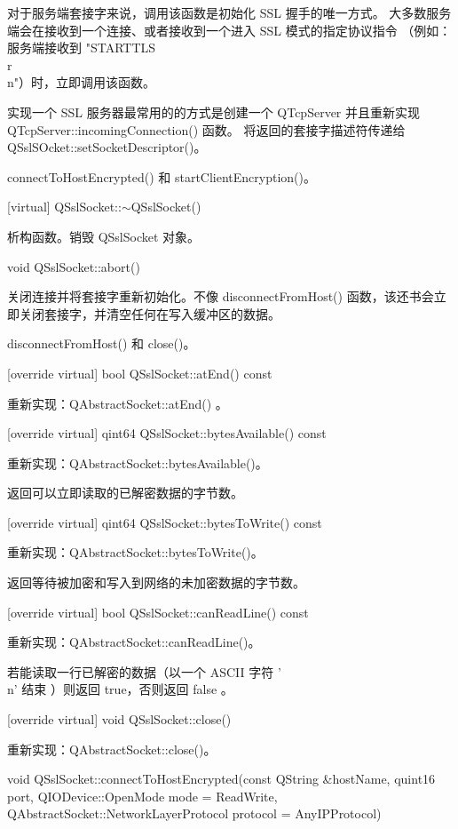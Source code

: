 对于服务端套接字来说，调用该函数是初始化 SSL 握手的唯一方式。
大多数服务端会在接收到一个连接、或者接收到一个进入 SSL 模式的指定协议指令
（例如：服务端接收到 "STARTTLS\\r\\n"）时，立即调用该函数。

实现一个 SSL 服务器最常用的的方式是创建一个 QTcpServer 并且重新实现 QTcpServer::incomingConnection() 函数。
将返回的套接字描述符传递给 QSslSOcket::setSocketDescriptor()。

\begin{seeAlso}
connectToHostEncrypted() 和 startClientEncryption()。
\end{seeAlso}

[virtual] QSslSocket::$\sim$QSslSocket()

析构函数。销毁 QSslSocket 对象。

void QSslSocket::abort()

关闭连接并将套接字重新初始化。不像 disconnectFromHost() 函数，该还书会立即关闭套接字，并清空任何在写入缓冲区的数据。

\begin{seeAlso}
disconnectFromHost() 和 close()。
\end{seeAlso}

[override virtual] bool QSslSocket::atEnd() const

重新实现：QAbstractSocket::atEnd() 。

[override virtual] qint64 QSslSocket::bytesAvailable() const

重新实现：QAbstractSocket::bytesAvailable()。

返回可以立即读取的已解密数据的字节数。

[override virtual] qint64 QSslSocket::bytesToWrite() const

重新实现：QAbstractSocket::bytesToWrite()。

返回等待被加密和写入到网络的未加密数据的字节数。

[override virtual] bool QSslSocket::canReadLine() const

重新实现：QAbstractSocket::canReadLine()。

若能读取一行已解密的数据（以一个 ASCII 字符 '\\n' 结束 ）则返回 true，否则返回 false 。

[override virtual] void QSslSocket::close()

重新实现：QAbstractSocket::close()。

void QSslSocket::connectToHostEncrypted(const QString \&hostName, quint16 port, QIODevice::OpenMode mode = ReadWrite, QAbstractSocket::NetworkLayerProtocol protocol = AnyIPProtocol)

